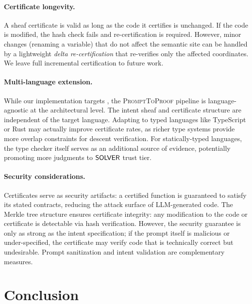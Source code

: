 \documentclass[11pt]{article}
\newcommand{\PromptToProof}{\textsc{PromptToProof}}
\begin{document}
\paragraph{Certificate longevity.}
A sheaf certificate is valid as long as the code it certifies is
unchanged.  If the code is modified, the hash check fails and
re-certification is required.  However, minor changes (\eg renaming
a variable) that do not affect the semantic site can be handled by
a lightweight \emph{delta re-certification} that re-verifies only
the affected coordinates.  We leave full incremental certification
to future work.

\paragraph{Multi-language extension.}
While our implementation targets \Python, the \PromptToProof{} pipeline
is language-agnostic at the architectural level.  The intent sheaf
and certificate structure are independent of the target language.
Adapting to typed languages like TypeScript or Rust may actually
improve certificate rates, as richer type systems provide more
overlap constraints for descent verification.  For statically-typed
languages, the type checker itself serves as an additional source
of evidence, potentially promoting more judgments to $\mathsf{SOLVER}$
trust tier.

\paragraph{Security considerations.}
Certificates serve as security artifacts: a certified function is
guaranteed to satisfy its stated contracts, reducing the attack
surface of LLM-generated code.  The Merkle tree structure ensures
certificate integrity: any modification to the code or certificate
is detectable via hash verification.  However, the security guarantee
is only as strong as the intent specification; if the prompt itself
is malicious or under-specified, the certificate may verify code
that is technically correct but undesirable.  Prompt sanitization
and intent validation are complementary measures.

\section{Conclusion}\label{sec:conclusion}
\end{document}
